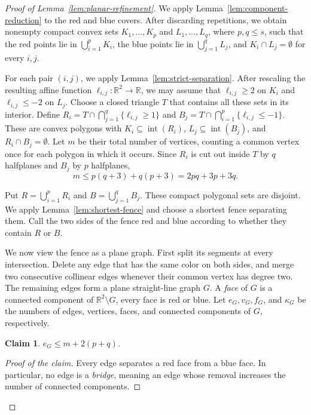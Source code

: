 \documentclass[11pt]{article}
\newtheorem{claim}[theorem]{Claim}
\theoremstyle{definition}
\newenvironment{poc}{\begin{proof}[Proof of the claim]\renewcommand*{\qedsymbol}{\(\blacksquare\)}}{\end{proof}}
\newcommand{\R}{\mathbb{R}}
\begin{document}
\begin{proof}[Proof of Lemma~\ref{lem:planar-refinement}]
We apply Lemma~\ref{lem:component-reduction} to the red and blue covers. After discarding repetitions, we obtain nonempty compact convex sets \(K_{1},\ldots,K_{p}\) and \(L_{1},\ldots,L_{q}\), where \(p,q\le s\), such that the red points lie in \(\bigcup_{i=1}^{p}K_{i}\), the blue points lie in \(\bigcup_{j=1}^{q}L_{j}\), and \(K_{i}\cap L_{j}=\emptyset\) for every \(i,j\).

For each pair \((i,j)\), we apply Lemma~\ref{lem:strict-separation}. After rescaling the resulting affine function \(\ell_{i,j}:\R^{2}\to\R\), we may assume that \(\ell_{i,j}\ge2\) on \(K_{i}\) and \(\ell_{i,j}\le-2\) on \(L_{j}\). Choose a closed triangle \(T\) that contains all these sets in its interior. Define \(R_{i}=T\cap\bigcap_{j=1}^{q}\{\ell_{i,j}\ge1\}\) and \(B_{j}=T\cap\bigcap_{i=1}^{p}\{\ell_{i,j}\le-1\}\). These are convex polygons with \(K_{i}\subseteq\operatorname{int}(R_{i})\), \(L_{j}\subseteq\operatorname{int}(B_{j})\), and \(R_{i}\cap B_{j}=\emptyset\). Let \(m\) be their total number of vertices, counting a common vertex once for each polygon in which it occurs. Since \(R_{i}\) is cut out inside \(T\) by \(q\) halfplanes and \(B_{j}\) by \(p\) halfplanes,
\[
m\le p(q+3)+q(p+3)=2pq+3p+3q.
\]

Put \(R=\bigcup_{i=1}^{p}R_{i}\) and \(B=\bigcup_{j=1}^{q}B_{j}\). These compact polygonal sets are disjoint. We apply Lemma~\ref{lem:shortest-fence} and choose a shortest fence separating them. Call the two sides of the fence red and blue according to whether they contain \(R\) or \(B\).

We now view the fence as a plane graph. First split its segments at every intersection. Delete any edge that has the same color on both sides, and merge two consecutive collinear edges whenever their common vertex has degree two. The remaining edges form a plane straight-line graph \(G\). A \emph{face} of \(G\) is a connected component of \(\R^{2}\setminus G\), every face is red or blue. Let \(e_{G},v_{G},f_{G}\), and \(\kappa_{G}\) be the numbers of edges, vertices, faces, and connected components of \(G\), respectively.

\begin{claim}\label{claim:planar-fence}
 \(e_{G}\le m+2(p+q)\).
\end{claim}

\begin{poc}
Every edge separates a red face from a blue face. In particular, no edge is a \emph{bridge}, meaning an edge whose removal increases the number of connected components.


\end{poc}
\end{proof}
\end{document}
